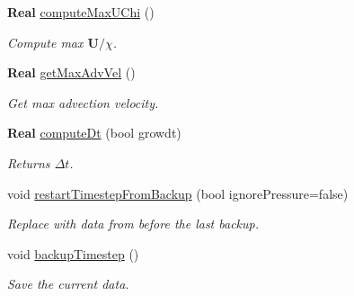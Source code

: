 \begin{DoxyCompactItemize}
\mbox{\label{class_a_m_r_level_mushy_layer_a5c70eeffd6fc54e52bfa1eda2bf2a9fe}} 
\textbf{ Real} \hyperlink{class_a_m_r_level_mushy_layer_a5c70eeffd6fc54e52bfa1eda2bf2a9fe}{compute\+Max\+U\+Chi} ()
\begin{DoxyCompactList}\small\item\em Compute max $ \mathbf{U}/\chi $. \end{DoxyCompactList}\item 
\mbox{\label{class_a_m_r_level_mushy_layer_ad43025c8b7491a8d8b0c125218b7d674}} 
\textbf{ Real} \hyperlink{class_a_m_r_level_mushy_layer_ad43025c8b7491a8d8b0c125218b7d674}{get\+Max\+Adv\+Vel} ()
\begin{DoxyCompactList}\small\item\em Get max advection velocity. \end{DoxyCompactList}\item 
\mbox{\label{class_a_m_r_level_mushy_layer_a3eee3de4d8921d0778ed037698c5d5c4}} 
\textbf{ Real} \hyperlink{class_a_m_r_level_mushy_layer_a3eee3de4d8921d0778ed037698c5d5c4}{compute\+Dt} (bool growdt)
\begin{DoxyCompactList}\small\item\em Returns $ \Delta t $. \end{DoxyCompactList}\item 
\mbox{\label{class_a_m_r_level_mushy_layer_adaba898a184c0cd44d6d1b12f52ef503}} 
void \hyperlink{class_a_m_r_level_mushy_layer_adaba898a184c0cd44d6d1b12f52ef503}{restart\+Timestep\+From\+Backup} (bool ignore\+Pressure=false)
\begin{DoxyCompactList}\small\item\em Replace with data from before the last backup. \end{DoxyCompactList}\item 
\mbox{\label{class_a_m_r_level_mushy_layer_a165220ab8589f345f78556bf427e3745}} 
void \hyperlink{class_a_m_r_level_mushy_layer_a165220ab8589f345f78556bf427e3745}{backup\+Timestep} ()
\begin{DoxyCompactList}\small\item\em Save the current data. \end{DoxyCompactList}\item 

\end{DoxyCompactItemize}
